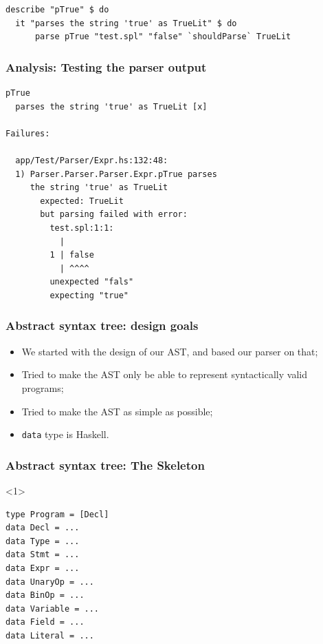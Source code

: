 \documentclass{beamer}
\begin{document}
\begin{frame}[fragile]
 \begin{verbatim}
describe "pTrue" $ do
  it "parses the string 'true' as TrueLit" $ do
      parse pTrue "test.spl" "false" `shouldParse` TrueLit
\end{verbatim}
\end{frame}

\begin{frame}[fragile]
  \frametitle{Analysis: Testing the parser output}


    \begin{verbatim}
pTrue
  parses the string 'true' as TrueLit [x]

Failures:

  app/Test/Parser/Expr.hs:132:48: 
  1) Parser.Parser.Parser.Expr.pTrue parses 
     the string 'true' as TrueLit
       expected: TrueLit
       but parsing failed with error:
         test.spl:1:1:
           |
         1 | false
           | ^^^^
         unexpected "fals"
         expecting "true"
    \end{verbatim}
\end{frame}


\begin{frame}
  \frametitle{Abstract syntax tree: design goals}

  \begin{itemize}[<+->]
    \item We started with the design of our AST, and based our parser on that;
    \item Tried to make the AST only be able to represent syntactically valid programs;
    \item Tried to make the AST as simple as possible;
    \item \texttt{data} type is Haskell.
  \end{itemize}
\end{frame}

\begin{frame}[fragile]
   \frametitle{Abstract syntax tree: The Skeleton}
     \begin{onlyenv}<1>
    \begin{verbatim}
type Program = [Decl] 
data Decl = ... 
data Type = ... 
data Stmt = ... 
data Expr = ... 
data UnaryOp = ... 
data BinOp = ... 
data Variable = ...
data Field = ...
data Literal = ...
    \end{verbatim}
  \end{onlyenv}

\end{frame}
\end{document}

